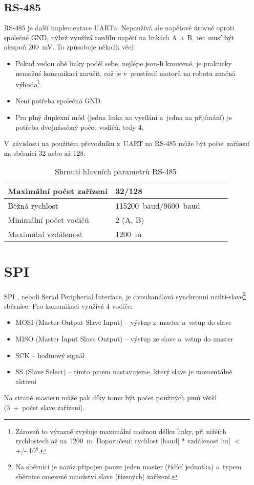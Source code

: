 \subsection{RS-485}\label{RS-485} %
RS-485 \cite{RS-485} je další implementace UARTu.
Nepoužívá ale napěťové úrovně oproti společné GND, nýbrž využívá rozdílu napětí na linkách A~a~B, ten musí být alespoň 200~mV.
To způsobuje několik věcí:
\begin{itemize}
	\item Pokud vedou obě linky podél sebe, nejlépe jsou-li kroucené, je prakticky nemožné komunikaci zarušit, což je v~prostředí motorů na robotu značná výhoda\footnote{Zároveň to výrazně zvyšuje maximální možnou délku linky, při nižších rychlostech až na 1200~m. Doporučení: rychlost [baud] * vzdálenost [m] $<$ +/- 10$^{8}$.}.  
	\item Není potřeba společná GND.
	\item Pro plný duplexní mód (jedna linka na vysílání a~jedna na přijímání) je potřeba dvojnásobný počet vodičů, tedy 4.
\end{itemize}
V~závislosti na použitém převodníku z~UART na RS-485 může být počet zařízení na sběrnici 32 nebo až 128.
\begin{table}[h]
		
	\centering
	\begin{tabular}{|l|l|l|l|l|} \hline
		Maximální počet zařízení & 32/128                \\ \hline
		Běžná rychlost              & 115200~baud/9600~baud \\ \hline
		Minimální počet vodičů    & 2 (A, B)              \\ \hline
		Maximální vzdálenost        & 1200~m                \\ \hline
	\end{tabular}
	\caption{Shrnutí hlavních parametrů RS-485}
\end{table}

\section{SPI}
SPI \cite{nxp:AN2847}, neboli Serial Peripherial Interface, je dvoukanálová synchronní multi-slave\footnote{Na sběrnici je naráz připojen pouze jeden master (řídící jednotka) a~typem sběrnice omezené množství slave (řízených) zařízení.} sběrnice.
Pro komunikaci využívá 4 vodiče:
\begin{itemize}
	\item MOSI (Master Output Slave Input) -- výstup z~master a~vstup do slave
	\item MISO (Master Input Slave Output) -- výstup ze slave a~vstup do master
	\item SCK -- hodinový signál
	\item SS (Slave Select) -- tímto pinem nastavujeme, který slave je momentálně aktivní
\end{itemize}
Na straně masteru může pak díky tomu být počet použitých pinů větší (3~+~počet slave zařízení).

